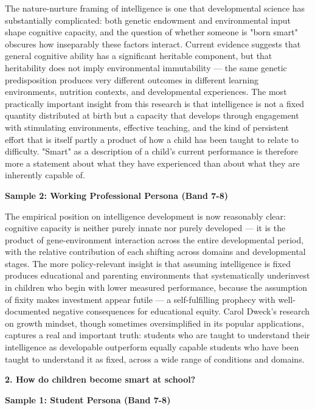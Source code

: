 The nature-nurture framing of intelligence is one that developmental science has substantially complicated: both genetic endowment and environmental input shape cognitive capacity, and the question of whether someone is "born smart" obscures how inseparably these factors interact. Current evidence suggests that general cognitive ability has a significant heritable component, but that heritability does not imply environmental immutability — the same genetic predisposition produces very different outcomes in different learning environments, nutrition contexts, and developmental experiences. The most practically important insight from this research is that intelligence is not a fixed quantity distributed at birth but a capacity that develops through engagement with stimulating environments, effective teaching, and the kind of persistent effort that is itself partly a product of how a child has been taught to relate to difficulty. "Smart" as a description of a child's current performance is therefore more a statement about what they have experienced than about what they are inherently capable of.

\textbf{Sample 2: Working Professional Persona (Band 7-8)}

The empirical position on intelligence development is now reasonably clear: cognitive capacity is neither purely innate nor purely developed — it is the product of gene-environment interaction across the entire developmental period, with the relative contribution of each shifting across domains and developmental stages. The more policy-relevant insight is that assuming intelligence is fixed produces educational and parenting environments that systematically underinvest in children who begin with lower measured performance, because the assumption of fixity makes investment appear futile — a self-fulfilling prophecy with well-documented negative consequences for educational equity. Carol Dweck's research on growth mindset, though sometimes oversimplified in its popular applications, captures a real and important truth: students who are taught to understand their intelligence as developable outperform equally capable students who have been taught to understand it as fixed, across a wide range of conditions and domains.

\separator

\begin{ieltsquestion}
\textbf{2. How do children become smart at school?}
\end{ieltsquestion}
\textbf{Sample 1: Student Persona (Band 7-8)}

